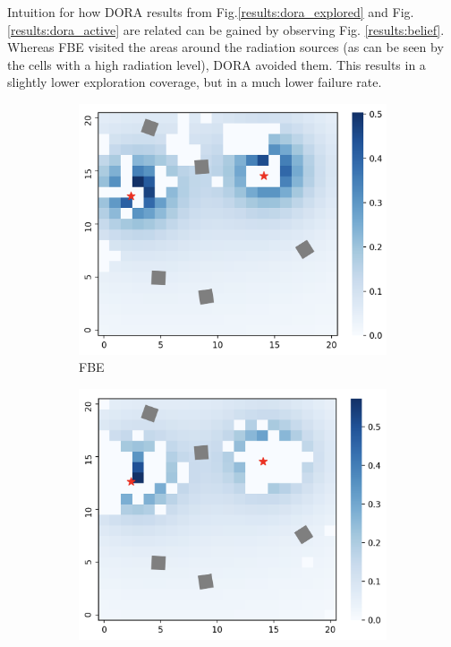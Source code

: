 Intuition for how \ac{DORA} results from Fig.\ref{results:dora_explored} and Fig. \ref{results:dora_active} are related can be gained by observing Fig. \ref{results:belief}. Whereas \ac{FBE} visited the areas around the radiation sources (as can be seen by the cells with a high radiation level), \ac{DORA} avoided them. This results in a slightly lower exploration coverage, but in a much lower failure rate.

\begin{figure}
    \centering
    \begin{subfigure}{0.45\textwidth}
        \includegraphics[width=\textwidth]{figures/dora_explorer/heatmap_frontier.png}
        \caption{\ac{FBE}}
        \label{results:belieffrontier}
    \end{subfigure}
    \begin{subfigure}{0.45\textwidth}
        \includegraphics[width=\textwidth]{figures/dora_explorer/heatmap_dora.png}

\end{subfigure}
\end{figure}
